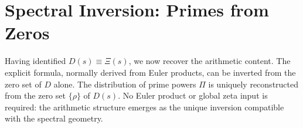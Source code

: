 \section{Spectral Inversion: Primes from Zeros}
Having identified $D(s) \equiv \Xi(s)$, we now recover the arithmetic content. The explicit formula, normally derived from Euler products, can be inverted from the zero set of $D$ alone. The distribution of prime powers $\Pi$ is uniquely reconstructed from the zero set $\{\rho\}$ of $D(s)$. No Euler product or global zeta input is required: the arithmetic structure emerges as the unique inversion compatible with the spectral geometry.